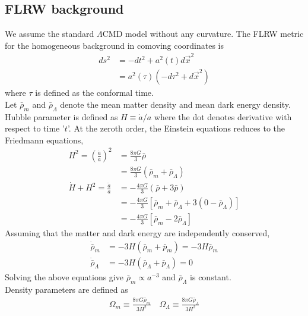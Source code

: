 \documentclass[12pt]{article}
\begin{document}
\subsection{FLRW background}
We assume the standard $\Lambda$CMD model without any curvature. The FLRW metric for the homogeneous background in comoving coordinates is
\begin{align}
ds^2 &= -dt^2 + a^2(t) d\vec{x}^2\\
&= a^2(\tau) \left( -d\tau^2 + d\vec{x}^2 \right) 
\end{align}
where $\tau$ is defined as the conformal time.\\
Let $\bar{\rho}_{m}$ and $\bar{\rho}_{\Lambda}$ denote the mean matter density and mean dark energy density. Hubble parameter is defined as $H \equiv \dot{a}/a$ where the dot denotes derivative with respect to time '$t$'. At the zeroth order, the Einstein equations reduces to the Friedmann equations,
\begin{align}
\nonumber
H^2 = \left(\frac{\dot{a}}{a}\right)^2 &= \frac{8 \pi G}{3} \bar{\rho} \\
\label{eq:fried-eqn-1}
&= \frac{8 \pi G}{3} \left( \bar{\rho}_{m} + \bar{\rho}_{\Lambda} \right) \\
\nonumber
\dot{H} + H^2 = \frac{\ddot{a}}{a} &= - \frac{4\pi G}{3} \left(\bar{\rho} + 3\bar{p} \right)\\
\nonumber
&= - \frac{4\pi G}{3} \left[ \bar{\rho}_{m} + \bar{\rho}_{\Lambda} + 3 (0 -\bar{\rho}_{\Lambda}) \right]\\
\label{eq:fried-eqn-2}
&= - \frac{4\pi G}{3} \left[ \bar{\rho}_{m} - 2 \bar{\rho}_{\Lambda} \right] 
\end{align}
%
Assuming that the matter and dark energy are independently conserved,
\begin{align}
\dot{\bar{\rho}}_{m} &= -3 H \left(\bar{\rho}_{m} + {\bar{p}_{m}}\right) = - 3 H \bar{\rho}_{m} \\
\dot{\bar{\rho}}_{\Lambda} &= -3 H \left(\bar{\rho}_{\Lambda} + \bar{p}_{\Lambda} \right) = 0
\end{align}
Solving the above equations give $\bar{\rho}_{m} \propto a^{-3}$ and $\bar{\rho}_{\Lambda}$ is constant.\\
Density parameters are defined as
\begin{align}
\Omega_{m} \equiv \frac{8 \pi G \bar{\rho}_{m}}{3 H^2} \quad
\Omega_{\Lambda} \equiv \frac{8 \pi G \bar{\rho}_{\Lambda}}{3 H^2}
\end{align}
\end{document}
